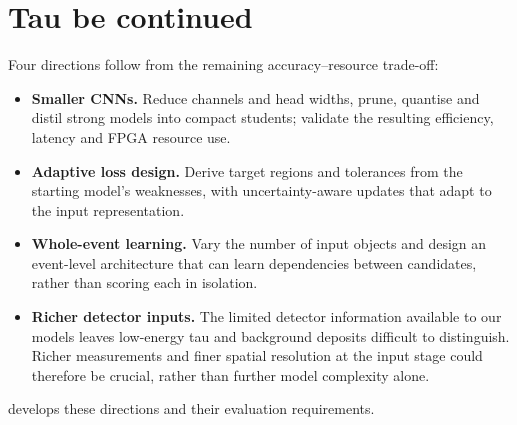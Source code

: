 \section{Tau be continued}
\label{sec:future}
Four directions follow from the remaining accuracy--resource trade-off:
\begin{itemize}
  \item \textbf{Smaller CNNs.} Reduce channels and head widths, prune, quantise and distil strong models into compact students; validate the resulting efficiency, latency and FPGA resource use.
  \item \textbf{Adaptive loss design.} Derive target regions and tolerances from the starting model's weaknesses, with uncertainty-aware updates that adapt to the input representation.
  \item \textbf{Whole-event learning.} Vary the number of input objects and design an event-level architecture that can learn dependencies between candidates, rather than scoring each in isolation.
  \item \textbf{Richer detector inputs.} The limited detector information available to our models leaves low-energy tau and background deposits difficult to distinguish. Richer measurements and finer spatial resolution at the input stage could therefore be crucial, rather than further model complexity alone.
\end{itemize}
 develops these directions and their evaluation requirements.
